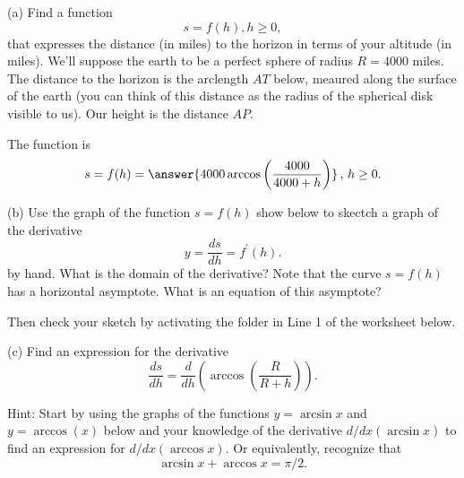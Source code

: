 \documentclass{ximera}
\begin{document}
\begin{question}  \label{Q:LLKDKFG}
(a) Find a function
\[
     s = f(h) , h\geq 0 ,
\]
that expresses the distance (in miles) to the horizon in terms of your altitude (in miles). We'll suppose the earth to be a perfect sphere of radius $R=4000$ miles. The distance to the horizon is the arclength $AT$ below, meaured along the surface of the earth (you can think of this distance as the radius of the spherical disk visible to us). Our height is the distance $AP$. 
 
The function is 
\[
   s = f(h) = \answer{4000 \arccos\left( \frac{4000}{4000+h} \right) } \, , \, h \geq 0 .
\]

\begin{onlineOnly}
    \begin{center}
\end{center}
\end{onlineOnly}

(b) Use the graph of the function $s=f(h)$ show below to skectch a graph of the derivative
\[
   y = \frac{ds}{dh} = f^\prime(h) .
\] 
by hand. What is the domain of the derivative? Note that the curve $s=f(h)$ has a horizontal asymptote. What is an equation of this asymptote?

\begin{onlineOnly}
    \begin{center}
\end{center}
\end{onlineOnly}

Then check your sketch by activating the folder in Line 1 of the worksheet below.

\begin{onlineOnly}
    \begin{center}
\end{center}
\end{onlineOnly}



(c) Find an expression for the derivative 
\[
       \frac{ds}{dh} = \frac{d}{dh} \left(  \arccos\left( \frac{R}{R+h} \right)     \right).  
\]

Hint: Start by using the graphs of the functions $y=\arcsin x$ and $y=\arccos(x)$ below and your knowledge of the derivative $d/dx(\arcsin x)$ to find an expression for $d/dx (\arccos x)$. Or equivalently, recognize that
\[
       \arcsin x + \arccos x  =\pi/2.   
\]

\begin{onlineOnly}
    \begin{center}
\end{center}
\end{onlineOnly}



\end{question}
\end{document}
